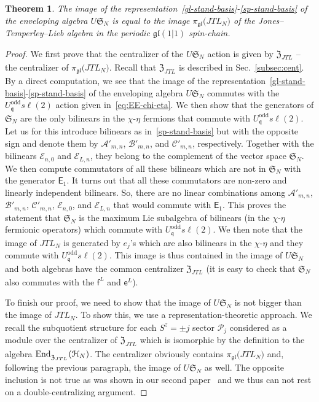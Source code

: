 \documentclass[11pt]{article}
\newcommand{\q}{\mathfrak{q}}
\newcommand{\JTL}[1]{JTL_{#1}}
\newcommand{\LQGodd}{U^{\text{odd}}_{\q} s\ell(2)}
\newcommand{\f}{\mathsf{f}}
\newcommand{\E}{\mathsf{E}}
\newcommand{\EE}[1]{\E_{#1}}
\newcommand{\e}{\mathsf{e}}
\newcommand{\Hilb}{\mathcal{H}}
\newcommand{\interLie}{\mathfrak{S}}
\newcommand{\interfin}[1]{\interLie_{#1}}
\newcommand{\Asp}{\mathcal{A}}
\newcommand{\Bsp}{\mathcal{B}}
\newcommand{\Csp}{\mathcal{C}}
\newcommand{\Egl}{\mathcal{E}}
\newcommand{\gl}{\mathfrak{gl}}
\newcommand{\EndcJTL}{\mathrm{End}_{\rule{0pt}{6.5pt}%
{\centJTL}}}
\newcommand{\repgl}{\pi_{\gl}}
\newcommand{\cent}{\mathfrak{Z}}
\newcommand{\centJTL}{\cent_{\JTL{}}}
\newcommand{\APrTL}[1]{\widehat{\mathscr{P}}_{#1}}
\newtheorem{Thm}[subsection]{Theorem}
\theoremstyle{definition}
\begin{document}
\begin{Thm}\label{Thm:US-JTL-iso}
The image of the representation~\eqref{gl-stand-basis}-\eqref{sp-stand-basis} of the enveloping algebra $U \interfin{N}$ is equal to the image $\repgl\bigl(\JTL{N}\bigr)$ of the Jones--Temperley--Lieb algebra in the periodic $\gl(1|1)$ spin-chain.
\end{Thm}
\begin{proof}
We first prove that the centralizer of the $U \interfin{N}$ action is given by $\centJTL$ -- the centralizer of $\repgl\bigl(\JTL{N}\bigr)$. Recall that $\centJTL$ is described in Sec.~\ref{subsec:cent}. By a direct computation, we see that  the image of the representation~\eqref{gl-stand-basis}-\eqref{sp-stand-basis} of the enveloping algebra $U \interfin{N}$    commutes with the $\LQGodd$ action given in~\eqref{eq:EE-chi-eta}.
We then show that the generators of $\interfin{N}$ are the only bilinears in the $\chi$-$\eta$ fermions that commute with  $\LQGodd$.  Let us for this introduce bilinears as in~\eqref{sp-stand-basis} but with the opposite sign and denote them by $\Asp'_{m,n}$, $\Bsp'_{m,n}$, and $\Csp'_{m,n}$, respectively. Together with the bilinears  $\Egl_{n,0}$ and  $\Egl_{L,n}$, they belong  to the complement of the   vector space $\interfin{N}$. We then compute  commutators of all these bilinears which are not in $\interfin{N}$ with the generator $\EE 1$. It turns out that all these commutators are non-zero and linearly independent bilinears. So, there are no linear combinations among    $\Asp'_{m,n}$, $\Bsp'_{m,n}$,  $\Csp'_{m,n}$, $\Egl_{n,0}$, and  $\Egl_{L,n}$ that would commute with $\EE 1$. This proves the statement that $\interfin{N}$ is the maximum Lie subalgebra of bilinears (in the $\chi$-$\eta$  fermionic operators) which commute with $\LQGodd$.
We then note that the image of $\JTL{N}$ is generated by $e_j$'s which are also bilinears in the $\chi$-$\eta$ and they commute with $\LQGodd$. This image is thus contained in the image of $U \interfin{N}$ and both algebras have the common centralizer $\centJTL$ (it is easy to check that $\interfin{N}$ also commutes with the $\f^L$ and $\e^L$).


To finish
our proof, we need to show that the image of $U \interfin{N}$ is not bigger than  the image of $\JTL{N}$. To show this, we use a representation-theoretic approach. We recall the  subquotient structure for each $S^z=\pm j$ sector $\APrTL{j}$
considered as a module over the centralizer of $\centJTL$ which is
isomorphic by the definition to the algebra $\EndcJTL(\Hilb_N)$. The
centralizer obviously contains $\repgl\bigl(\JTL{N}\bigr)$ and, following the previous paragraph, the image of $U \interfin{N}$ as well. The opposite inclusion  is not true as was shown in our second paper~\cite[Sec.~5]{GRS2} and we thus can not rest on a double-centralizing argument.


\end{proof}
\end{document}
